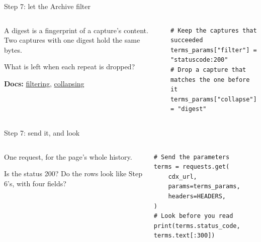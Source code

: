 \documentclass[9pt,aspectratio=169]{beamer}
\begin{document}
\begin{frame}[fragile]{Step 7: let the Archive filter}
    \begin{columns}[T]
        \begin{column}{0.37\textwidth}
            A digest is a fingerprint of a capture's content. Two captures with one digest hold the same bytes.

            \medskip
            What is left when each repeat is dropped?

            \medskip
            {\scriptsize\textbf{Docs:} \href{https://github.com/internetarchive/wayback/tree/master/wayback-cdx-server\#filtering}{filtering}, \href{https://github.com/internetarchive/wayback/tree/master/wayback-cdx-server\#collapsing}{collapsing}\par}
        \end{column}
        \begin{column}{0.6\textwidth}
\begin{lstlisting}
# Keep the captures that succeeded
terms_params["filter"] = "statuscode:200"
# Drop a capture that matches the one before it
terms_params["collapse"] = "digest"
\end{lstlisting}
        \end{column}
    \end{columns}
\end{frame}

\begin{frame}[fragile]{Step 7: send it, and look}
    \begin{columns}[T]
        \begin{column}{0.37\textwidth}
            One request, for the page's whole history.

            \medskip
            Is the status 200? Do the rows look like Step 6's, with four fields?
        \end{column}
        \begin{column}{0.6\textwidth}
\begin{lstlisting}
# Send the parameters
terms = requests.get(
    cdx_url,
    params=terms_params,
    headers=HEADERS,
)
# Look before you read
print(terms.status_code, terms.text[:300])
\end{lstlisting}
        \end{column}
    \end{columns}
\end{frame}
\end{document}
